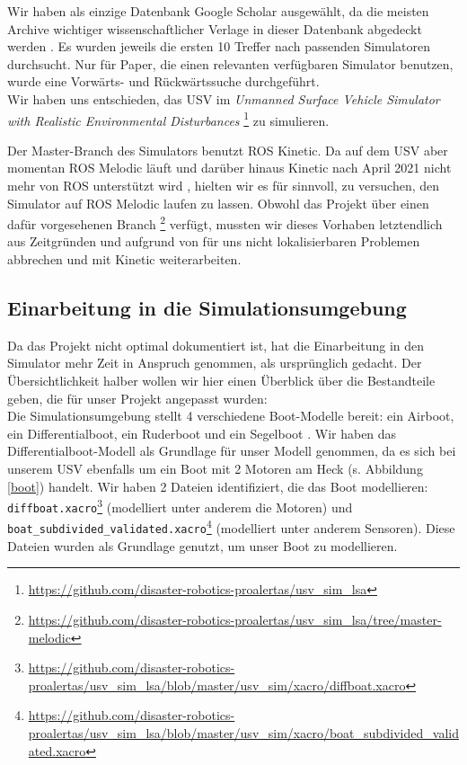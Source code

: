 \documentclass[11pt]{article}
\begin{document}
Wir haben als einzige Datenbank Google Scholar ausgewählt, da die meisten Archive wichtiger wissenschaftlicher Verlage in dieser Datenbank abgedeckt werden \cite{googlescholar}. Es wurden jeweils die ersten 10 Treffer nach passenden Simulatoren durchsucht. Nur für Paper, die einen relevanten verfügbaren Simulator benutzen, wurde eine Vorwärts- und Rückwärtssuche durchgeführt.\\

Wir haben uns entschieden, das USV im \textit{Unmanned Surface Vehicle Simulator with Realistic Environmental Disturbances} \footnote{\url{https://github.com/disaster-robotics-proalertas/usv_sim_lsa}} zu simulieren.

Der Master-Branch des Simulators benutzt ROS Kinetic. Da auf dem USV aber momentan ROS Melodic läuft und darüber hinaus Kinetic nach April 2021 nicht mehr von ROS unterstützt wird \cite{rosdistros}, hielten wir es für sinnvoll, zu versuchen, den Simulator auf ROS Melodic laufen zu lassen. Obwohl das Projekt über einen dafür vorgesehenen Branch \footnote{\url{https://github.com/disaster-robotics-proalertas/usv_sim_lsa/tree/master-melodic}} verfügt, mussten wir dieses Vorhaben letztendlich aus Zeitgründen und aufgrund von für uns nicht lokalisierbaren Problemen abbrechen und mit Kinetic weiterarbeiten.

\subsection{Einarbeitung in die Simulationsumgebung}

Da das Projekt nicht optimal dokumentiert ist, hat die Einarbeitung in den Simulator mehr Zeit in Anspruch genommen, als ursprünglich gedacht. Der Übersichtlichkeit halber wollen wir hier einen Überblick über die Bestandteile geben, die für unser Projekt angepasst wurden:\\
Die Simulationsumgebung stellt 4 verschiedene Boot-Modelle bereit: ein Airboot, ein Differentialboot, ein Ruderboot und ein Segelboot \cite{paravisi2019}. Wir haben das Differentialboot-Modell als Grundlage für unser Modell genommen, da es sich bei unserem USV ebenfalls um ein Boot mit 2 Motoren am Heck (s. Abbildung \ref{boot}) handelt. Wir haben 2 Dateien identifiziert, die das Boot modellieren: \texttt{diffboat.xacro}\footnote{\url{https://github.com/disaster-robotics-proalertas/usv_sim_lsa/blob/master/usv_sim/xacro/diffboat.xacro}} (modelliert unter anderem die Motoren) und \texttt{boat\_subdivided\_validated.xacro}\footnote{\url{https://github.com/disaster-robotics-proalertas/usv_sim_lsa/blob/master/usv_sim/xacro/boat_subdivided_validated.xacro}} (modelliert unter anderem Sensoren). Diese Dateien wurden als Grundlage genutzt, um unser Boot zu modellieren.
\end{document}
